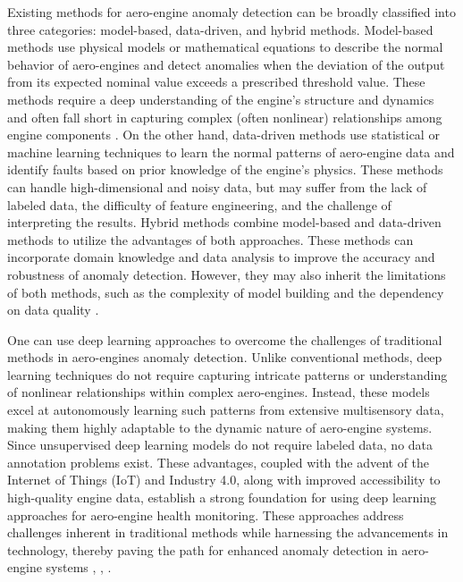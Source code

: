 \documentclass[journal]{IEEEtran}
\begin{document}
Existing methods for aero-engine anomaly detection can be broadly classified into three categories: model-based, data-driven, and hybrid methods. Model-based methods use physical models or mathematical equations to describe the normal behavior of aero-engines and detect anomalies when the deviation of the output from its expected nominal value exceeds a prescribed threshold value. These methods require a deep understanding of the engine’s structure and dynamics and often fall short in capturing complex (often nonlinear) relationships among engine components \cite{model1}. On the other hand, data-driven methods use statistical or machine learning techniques to learn the normal patterns of aero-engine data and identify faults based on prior knowledge of the engine’s physics. These methods can handle high-dimensional and noisy data, but may suffer from the lack of labeled data, the difficulty of feature engineering, and the challenge of interpreting the results. Hybrid methods combine model-based and data-driven methods to utilize the advantages of both approaches. These methods can incorporate domain knowledge and data analysis to improve the accuracy and robustness of anomaly detection. However, they may also inherit the limitations of both methods, such as the complexity of model building and the dependency on data quality \cite{model2,model3}.

One can use deep learning approaches to overcome the challenges of traditional methods in aero-engines anomaly detection. Unlike conventional methods, deep learning techniques do not require capturing intricate patterns or understanding of nonlinear relationships within complex aero-engines. Instead, these models excel at autonomously learning such patterns from extensive multisensory data, making them highly adaptable to the dynamic nature of aero-engine systems. Since unsupervised deep learning models do not require labeled data, no data annotation problems exist. These advantages, coupled with the advent of the Internet of Things (IoT) and Industry 4.0, along with improved accessibility to high-quality engine data, establish a strong foundation for using deep learning approaches for aero-engine health monitoring. These approaches address challenges inherent in traditional methods while harnessing the advancements in technology, thereby paving the path for enhanced anomaly detection in aero-engine systems \cite{deeplearning1}, \cite{deeplearning2}, \cite{deeplearning3}.
\end{document}
